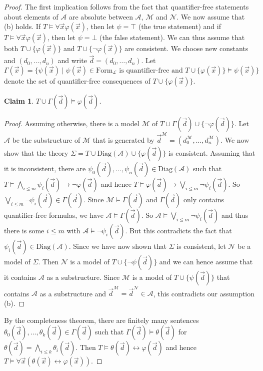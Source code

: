 \documentclass[a4paper, 11pt]{amsart}
\newtheorem{claim}[theorem]{Claim}
\theoremstyle{remark}
\newcommand{\cA}{\mathcal A}
\newcommand{\cL}{\mathcal L}
\newcommand{\cM}{\mathcal M}
\newcommand{\cN}{\mathcal N}
\begin{document}
\begin{proof} 
The first implication follows from the fact that quantifier-free statements about elements of $\cA$ are absolute between $\cA$, $\cM$ and $\cN$. 
We now assume that (b) holds. If $T\models \forall \vec{x} \varphi(\vec{x})$, then let $\psi=\top$ (the true statement) and if $T\models \forall \vec{x} \varphi(\vec{x})$, then let $\psi=\bot$ (the false statement). We can thus assume that both $T\cup\{\varphi(\vec{x})\}$ and $T\cup\{\neg\varphi(\vec{x})\}$ are consistent. We choose new constants  and $(d_0,\dots,d_n)$ and write $\vec{d}=(d_0,\dots,d_n)$. 
Let 
$$\Gamma(\vec{x})=\{\psi(\vec{x})\mid\psi(\vec{x})\in\mathrm{Form}_{\cL}\text{ is quantifier-free and }T\cup\{\varphi(\vec{x})\}\models\psi(\vec{x})\}$$ denote the set of quantifier-free consequences of $T\cup\{\varphi(\vec{x})\}$. 

\begin{claim} 
$T\cup \Gamma(\vec{d})\models\varphi(\vec{d})$. 
\end{claim} 
\begin{proof} 
Assuming otherwise, there is a model $\cM$ of $T\cup \Gamma(\vec{d})\cup\{\neg\varphi(\vec{d})\}$. Let $\cA$ be the substructure of $\cM$ that is generated by $\vec{d}^\cM=(d_0^\cM,\dots,d_n^\cM)$. 
We now show that the theory $\Sigma=T\cup\mathrm{Diag}(\cA)\cup\{\varphi(\vec{d})\}$ is consistent. Assuming that it is inconsistent, there are $\psi_0(\vec{d}),\dots,\psi_n(\vec{d})\in\mathrm{Diag}(\cA)$ such that $T\models \bigwedge_{i\leq m}\psi_i(\vec{d}) \rightarrow \neg\varphi(\vec{d})$ and hence $T\models \varphi(\vec{d})\rightarrow \bigvee_{i\leq m}\neg\psi_i(\vec{d})$. So $\bigvee_{i\leq m}\neg\psi_i(\vec{d})\in \Gamma(\vec{d})$. Since $\cM\models \Gamma(\vec{d})$ and $\Gamma(\vec{d})$ only contains quantifier-free formulas, we have $\cA\models \Gamma(\vec{d})$. So $\cA\models \bigvee_{i\leq m}\neg\psi_i(\vec{d})$ and thus there is some $i\leq m$ with $\cA\models \neg\psi_i(\vec{d})$. But this contradicts the fact that $\psi_i(\vec{d})\in \mathrm{Diag}(\cA)$. 
Since we have now shown that $\Sigma$ is consistent, let $\cN$ be a model of $\Sigma$. Then $\cN$ is a model of $T\cup\{\neg\psi(\vec{d})\}$ and we can hence assume that it contains $\cA$ as a substructure. Since $\cM$ is a model of $T\cup\{\psi(\vec{d})\}$ that contains $\cA$ as a substructure and $\vec{d}^\cM=\vec{d}^\cN\in \cA$, this contradicts our assumption (b). 
\end{proof} 

By the completeness theorem, there are finitely many sentences $\theta_0(\vec{d}),\dots,\theta_k(\vec{d})\in \Gamma(\vec{d})$ such that $\Gamma(\vec{d})\models \theta(\vec{d})$ for $\theta(\vec{d})=\bigwedge_{i\leq k}\theta_i(\vec{d})$. Then $T\models\theta(\vec{d})\leftrightarrow \varphi(\vec{d})$ and hence $T\models \forall \vec{x}(\theta(\vec{x})\leftrightarrow \varphi(\vec{x}))$. 
\end{proof} 
\end{document}
